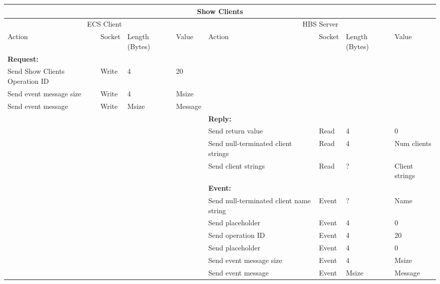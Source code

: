\bigskip
\small
\begin{tabular}{|p{1.2in}|p{.4in}|p{.4in}|p{.5in}|p{1.2in}|p{.4in}|p{.4in}|p{.5in} |} \hline
\multicolumn{8}{|c|}{{\bf Show Clients}} \\ \hline
\multicolumn{4}{|c|}{ECS Client} & \multicolumn{4}{|c|}{HBS Server} \\ \hline
Action            & Socket & Length  
                            (Bytes)& Value & Action       & Socket & Length 
                                                                    (Bytes)& Value \\ \hline
\multicolumn{4}{|l}{{\bf Request:}}&\multicolumn{4}{|l|}{~} \\ \hline
Send Show Clients Operation ID  & Write  & 4     & 20     &              &        &       &       \\ \hline
Send event
message size      & Write  & 4     &  Msize &         &        &       &       \\ \hline
Send event message
                  & Write  &  Msize  &  Message &     &        &       &       \\ \hline
\multicolumn{4}{|l}{~}&\multicolumn{4}{|l|}{{\bf Reply:}} \\ \hline
                  &        &       &       & Send return
                                             value        & Read   &  4    & 0       \\ \hline
                  &        &       &       & Send null-terminated  client strings & Read &  4    &  Num clients \\ \hline
                  &        &       &       & Send client strings & Read   & ? &  Client strings \\ \hline
\multicolumn{4}{|l}{~}&\multicolumn{4}{|l|}{{\bf Event:}} \\ \hline
                  &        &       &       & Send null-terminated client
                                             name string  & Event  &  ?    & Name  \\ \hline
                  &        &       &       & Send placeholder  & Event  &   4   &   0    \\  \hline
                  &        &       &       & Send operation 
                                             ID           & Event  &   4   &  20   \\ \hline
                  &        &       &       & Send placeholder     & Event  &   4   &  0    \\ \hline
                  &        &       &       & Send event message
                                                  size    & Event  &   4   &  Msize \\ \hline
                  &        &       &       & Send event message
                                                          & Event  & Msize & Message  \\ \hline
\end{tabular}
\normalsize
\bigskip


